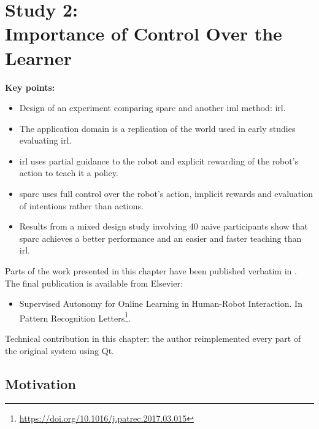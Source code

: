\chapter[Study 2: Importance of Control Over the Learner]{Study 2: \\ Importance of Control Over the Learner}\label{chap:control}
\glsresetall
\graphicspath{{images/control/}}

\newcommand{\nosemic}{\SetEndCharOfAlgoLine{\relax}}
\newcommand{\dosemic}{\SetEndCharOfAlgoLine{\string;}}
\newcommand{\pushline}{\Indp}
\newcommand{\popline}{\Indm\dosemic}

\begin{framed}
	\textbf{Key points:}
	
	\begin{itemize}
		\item Design of an experiment comparing \acrshort{sparc} and another \acrlong{iml} method: \acrfull{irl}.
		\item The application domain is a replication of the world used in early studies evaluating \acrshort{irl}.
		\item \acrshort{irl} uses partial guidance to the robot and explicit rewarding of the robot's action to teach it a policy.
		\item \acrshort{sparc} uses full control over the robot's action, implicit rewards and evaluation of intentions rather than actions.
		\item Results from a mixed design study involving 40 naive participants show that \acrshort{sparc} achieves a better performance and an easier and faster teaching than \acrshort{irl}.
	\end{itemize}
\end{framed}

Parts of the work presented in this chapter have been published verbatim in \cite{senft2017supervised}. The final publication is available from Elsevier:
\begin{itemize}
	\item Supervised Autonomy for Online Learning in Human-Robot Interaction. In Pattern Recognition Letters\footnote{\url{https://doi.org/10.1016/j.patrec.2017.03.015}}.
\end{itemize} 

Technical contribution in this chapter: the author reimplemented every part of the original system using Qt.

\newpage
\section{Motivation}

